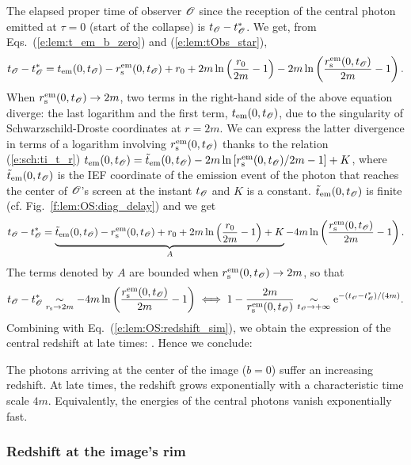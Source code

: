 The elapsed proper time of observer $\mathscr{O}$
since the reception of the central photon emitted
at $\tau = 0$ (start of the collapse) is $t_{\mathscr{O}} - t_{\mathscr{O}}^*$.
We get, from Eqs.~(\ref{e:lem:t_em_b_zero}) and (\ref{e:lem:tObs_star}),
\[
    t_{\mathscr{O}} - t_{\mathscr{O}}^* =  t_{\rm em}(0, t_{\mathscr{O}}) - r_{\rm s}^{\rm em}(0,t_{\mathscr{O}}) + r_0
        + 2m \ln\left(\frac{r_0}{2m} - 1 \right)
        - 2m \ln\left(\frac{r_{\rm s}^{\rm em}(0,t_{\mathscr{O}})}{2m} - 1 \right) .
\]
When $r_{\rm s}^{\rm em}(0,t_{\mathscr{O}}) \to 2m$, two terms in the right-hand side
of the above equation diverge: the last logarithm and the first term,
$t_{\rm em}(0, t_{\mathscr{O}})$, due to the singularity of Schwarzschild-Droste coordinates
at $r=2m$. We can express the latter divergence in terms of a logarithm
involving $r_{\rm s}^{\rm em}(0,t_{\mathscr{O}})$ thanks to the relation
(\ref{e:sch:ti_t_r})
$t_{\rm em}(0, t_{\mathscr{O}}) = {\tilde t}_{\rm em}(0,t_{\mathscr{O}}) - 2m
\ln\left[ {r_{\rm s}^{\rm em}(0,t_{\mathscr{O}})}/{2m}  - 1 \right] + K$,
where ${\tilde t}_{\rm em}(0,t_{\mathscr{O}})$ is the IEF coordinate
of the emission event of the photon that reaches the center of $\mathscr{O}$'s screen
at the instant $t_{\mathscr{O}}$
and $K$ is a constant.
${\tilde t}_{\rm em}(0,t_{\mathscr{O}})$ is finite (cf. Fig.~\ref{f:lem:OS:diag_delay})
and we get
\[
    t_{\mathscr{O}} - t_{\mathscr{O}}^* = \underbrace{{\tilde t}_{\rm em}(0,t_{\mathscr{O}}) - r_{\rm s}^{\rm em}(0,t_{\mathscr{O}}) + r_0
    + 2 m \ln \left( \frac{r_0}{2m} - 1 \right) + K}_{A}
    -  4 m \ln \left( \frac{r_{\rm s}^{\rm em}(0,t_{\mathscr{O}})}{2 m}  - 1 \right) .
\]
The terms denoted by $A$ are bounded when $r_{\rm s}^{\rm em}(0,t_{\mathscr{O}}) \to 2m$, so that
\[
    t_{\mathscr{O}} - t_{\mathscr{O}}^*  \underset{r_{\rm s}\to 2m}{\sim} -  4 m \ln \left( \frac{r_{\rm s}^{\rm em}(0,t_{\mathscr{O}})}{2 m}  - 1 \right)
    \iff 1 - \frac{2m}{r_{\rm s}^{\rm em}(0,t_{\mathscr{O}})}
    \underset{t_{\mathscr{O}} \to +\infty}{\sim} \mathrm{e}^{-(t_{\mathscr{O}} - t_{\mathscr{O}}^*)/(4 m)} .
\]
Combining with Eq.~(\ref{e:lem:OS:redshift_sim}), we obtain the expression
of the central redshift at late times:
\be \label{e:lem:central_redshift}
    .
\ee
Hence we conclude:
\begin{greybox}
The photons arriving at the center of the image ($b=0$) suffer an
increasing redshift. At late times, the redshift grows exponentially
with a characteristic time scale $4 m$. Equivalently, the energies of the central photons
vanish exponentially fast.
\end{greybox}

\subsubsection{Redshift at the image's rim}

